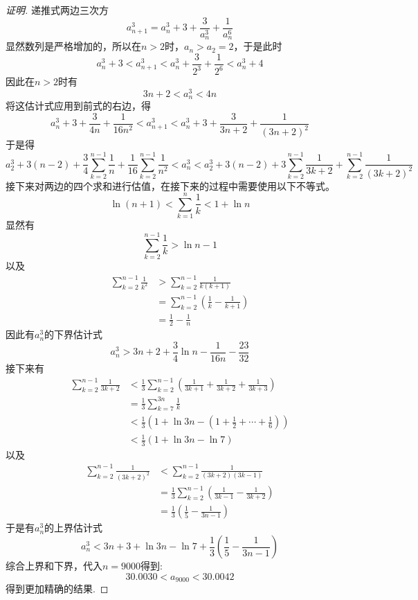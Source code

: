 \begin{proof}[证明]
  递推式两边三次方
  \[ a_{n+1}^3 = a_n^3 + 3 + \frac{3}{a_n^3} + \frac{1}{a_n^6} \]
  显然数列是严格增加的，所以在$n>2$时，$a_n>a_2=2$，于是此时
  \[ a_n^3+3 < a_{n+1}^3 < a_n^3 + \frac{3}{2^3}+\frac{1}{2^6}<a_n^3+4 \]
  因此在$n>2$时有
  \[ 3n+2<a_n^3<4n \]
  将这估计式应用到前式的右边，得
  \[ a_n^3 + 3 + \frac{3}{4n} + \frac{1}{16n^2} < a_{n+1}^3 < a_n^3 + 3 + \frac{3}{3n+2} + \frac{1}{(3n+2)^2} \]
  于是得
  \[ a_2^3 + 3(n-2) + \frac{3}{4}\sum_{k=2}^{n-1} \frac{1}{n} + \frac{1}{16}\sum_{k=2}^{n-1} \frac{1}{n^2} < a_n^3 < a_2^3 + 3(n-2) + 3\sum_{k=2}^{n-1} \frac{1}{3k+2} + \sum_{k=2}^{n-1} \frac{1}{(3k+2)^2} \]
 接下来对两边的四个求和进行估值，在接下来的过程中需要使用以下不等式。
  \[ \ln{(n+1)} < \sum_{k=1}^n \frac{1}{k} < 1 + \ln{n} \]
  显然有
    \[ \sum_{k=2}^{n-1} \frac{1}{k} > \ln{n} - 1 \]
    以及
    \begin{align*}
      \sum_{k=2}^{n-1} \frac{1}{k^2} & > \sum_{k=2}^{n-1} \frac{1}{k(k+1)} \\
                                     & = \sum_{k=2}^{n-1} \left( \frac{1}{k} - \frac{1}{k+1} \right) \\
      & = \frac{1}{2} - \frac{1}{n}
    \end{align*}
    因此有$a_n^3$的下界估计式
    \[ a_n^3 > 3n+2+\frac{3}{4} \ln{n} -\frac{1}{16n} - \frac{23}{32} \]
    接下来有
  \begin{align*}
    \sum_{k=2}^{n-1} \frac{1}{3k+2} & < \frac{1}{3} \sum_{k=2}^{n-1} \left( \frac{1}{3k+1} + \frac{1}{3k+2} + \frac{1}{3k+3} \right) \\
                                & = \frac{1}{3} \sum_{k=7}^{3n} \frac{1}{k} \\
                                    & < \frac{1}{3} \left( 1+\ln{3n} - \left( 1+\frac{1}{2}+\cdots+\frac{1}{6} \right) \right) \\
    & < \frac{1}{3} \left( 1+\ln{3n} - \ln{7} \right)
  \end{align*}
  以及
  \begin{align*}
    \sum_{k=2}^{n-1} \frac{1}{(3k+2)^2} & < \sum_{k=2}^{n-1} \frac{1}{(3k+2)(3k-1)} \\
                                        & = \frac{1}{3} \sum_{k=2}^{n-1} \left( \frac{1}{3k-1} - \frac{1}{3k+2} \right) \\
    & = \frac{1}{3} \left( \frac{1}{5} - \frac{1}{3n-1} \right)
  \end{align*}
  于是有$a_n^3$的上界估计式
  \[ a_n^3 < 3n+3 +\ln{3n} - \ln{7} + \frac{1}{3} \left( \frac{1}{5} - \frac{1}{3n-1} \right) \]
  综合上界和下界，代入$n=9000$得到:
  \[ 30.0030 < a_{9000} < 30.0042 \]
 得到更加精确的结果.
 \end{proof}


